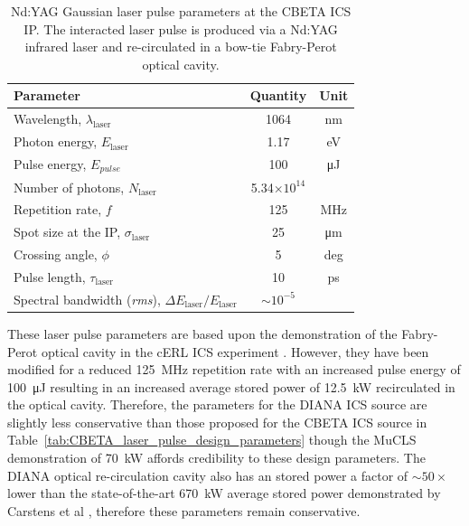 \documentclass[../main.tex]{subfiles}
\begin{document}
\begin{table}[!h]
\centering
\caption{Nd:YAG Gaussian laser pulse parameters at the CBETA ICS IP. The interacted laser pulse is produced via a Nd:YAG infrared laser and re-circulated in a bow-tie Fabry-Perot optical cavity.}
\begin{tabular}{lcc}
\hline\hline
Parameter & Quantity & Unit \\
\hline
Wavelength, $\lambda_\textrm{laser}$ & 1064 & \si{\nano\meter}\\
Photon energy, $E_\textrm{laser}$ & 1.17 & \si{\electronvolt}\\
Pulse energy, $E_{pulse}$  & 100 & \si{\micro\joule}\\
Number of photons, $N_{\textrm{laser}}$ & 5.34$\times 10^{14}$ & \\ 
Repetition rate, $f$ & 125 & \si{\mega\hertz}\\
Spot size at the IP, $\sigma_\textrm{laser}$ & 25 & \si{\micro\meter}\\
Crossing angle, $\phi$ & 5 & deg \\
Pulse length, $\tau_{\mathrm{laser}}$  & 10 & \si{\pico\second}\\
Spectral bandwidth (\textit{rms}), $\Delta E_\textrm{laser}/E_\textrm{laser}$ & $\sim10^{-5}$ &   \\
\hline\hline
\end{tabular}
\label{tab:DIANA_laser_pulse_design_parameters}
\end{table}

These laser pulse parameters are based upon the demonstration of the Fabry-Perot optical cavity in the cERL ICS experiment \cite{akagi2016narrow}. However, they have been modified for a reduced 125~\si{\mega\hertz} repetition rate with an increased pulse energy of 100~\si{\micro\joule} resulting in an increased average stored power of 12.5~\si{\kilo\watt} recirculated in the optical cavity. Therefore, the parameters for the DIANA ICS source are slightly less conservative than those proposed for the CBETA ICS source in Table~\ref{tab:CBETA_laser_pulse_design_parameters} though the MuCLS demonstration of 70~\si{\kilo\watt} \cite{eggl2016munich} affords credibility to these design parameters. The DIANA optical re-circulation cavity also has an  stored power a factor of $\sim50\times$ lower than the state-of-the-art 670~\si{\kilo\watt} average stored power demonstrated by Carstens et al \cite{carstens2014megawatt}, therefore these parameters remain conservative. 
\end{document}
